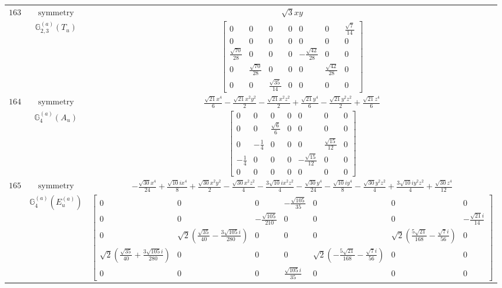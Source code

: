 \documentclass[fleqn,8pt,landscape]{jsarticle}
\begin{document}
\begin{longtable}{ccc}
$ 163 $ & $ \text{symmetry} $ & $ \sqrt{3} x y $ \\
$  $ & $ \mathbb{G}_{2,3}^{(a)}(T_{u}) $ & $ \begin{bmatrix} 0 & 0 & 0 & 0 & 0 & 0 & \frac{\sqrt{7}}{14} \\ 0 & 0 & 0 & 0 & 0 & 0 & 0 \\ \frac{\sqrt{70}}{28} & 0 & 0 & 0 & - \frac{\sqrt{42}}{28} & 0 & 0 \\ 0 & \frac{\sqrt{70}}{28} & 0 & 0 & 0 & \frac{\sqrt{42}}{28} & 0 \\ 0 & 0 & \frac{\sqrt{35}}{14} & 0 & 0 & 0 & 0 \end{bmatrix} $ \\ \hline
$ 164 $ & $ \text{symmetry} $ & $ \frac{\sqrt{21} x^{4}}{6} - \frac{\sqrt{21} x^{2} y^{2}}{2} - \frac{\sqrt{21} x^{2} z^{2}}{2} + \frac{\sqrt{21} y^{4}}{6} - \frac{\sqrt{21} y^{2} z^{2}}{2} + \frac{\sqrt{21} z^{4}}{6} $ \\
$  $ & $ \mathbb{G}_{4}^{(a)}(A_{u}) $ & $ \begin{bmatrix} 0 & 0 & 0 & 0 & 0 & 0 & 0 \\ 0 & 0 & \frac{\sqrt{6}}{6} & 0 & 0 & 0 & 0 \\ 0 & - \frac{1}{4} & 0 & 0 & 0 & \frac{\sqrt{15}}{12} & 0 \\ - \frac{1}{4} & 0 & 0 & 0 & - \frac{\sqrt{15}}{12} & 0 & 0 \\ 0 & 0 & 0 & 0 & 0 & 0 & 0 \end{bmatrix} $ \\ \hline
$ 165 $ & $ \text{symmetry} $ & $ - \frac{\sqrt{30} x^{4}}{24} + \frac{\sqrt{10} i x^{4}}{8} + \frac{\sqrt{30} x^{2} y^{2}}{2} - \frac{\sqrt{30} x^{2} z^{2}}{4} - \frac{3 \sqrt{10} i x^{2} z^{2}}{4} - \frac{\sqrt{30} y^{4}}{24} - \frac{\sqrt{10} i y^{4}}{8} - \frac{\sqrt{30} y^{2} z^{2}}{4} + \frac{3 \sqrt{10} i y^{2} z^{2}}{4} + \frac{\sqrt{30} z^{4}}{12} $ \\
$  $ & $ \mathbb{G}_{4}^{(a)}(E_{u}^{(a)}) $ & $ \begin{bmatrix} 0 & 0 & 0 & - \frac{\sqrt{105}}{35} & 0 & 0 & 0 \\ 0 & 0 & - \frac{\sqrt{105}}{210} & 0 & 0 & 0 & - \frac{\sqrt{21} i}{14} \\ 0 & \sqrt{2} \left(\frac{\sqrt{35}}{40} - \frac{3 \sqrt{105} i}{280}\right) & 0 & 0 & 0 & \sqrt{2} \left(\frac{5 \sqrt{21}}{168} - \frac{\sqrt{7} i}{56}\right) & 0 \\ \sqrt{2} \left(\frac{\sqrt{35}}{40} + \frac{3 \sqrt{105} i}{280}\right) & 0 & 0 & 0 & \sqrt{2} \left(- \frac{5 \sqrt{21}}{168} - \frac{\sqrt{7} i}{56}\right) & 0 & 0 \\ 0 & 0 & 0 & \frac{\sqrt{105} i}{35} & 0 & 0 & 0 \end{bmatrix} $ \\ \hline

\end{longtable}
\end{document}
